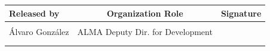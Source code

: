 \begin{center}
\begin{longtable*}{|l|c|c|}
    \textbf{Released by}     &  \textbf{Organization Role}         & \textbf{Signature} \\ \hline
      &  & \\ 
    \'Alvaro Gonz\'alez           &  ALMA Deputy Dir. for Development                       &  \\         &  & \\        
            &  & \\ \hline 
\end{longtable*}

\end{center}

